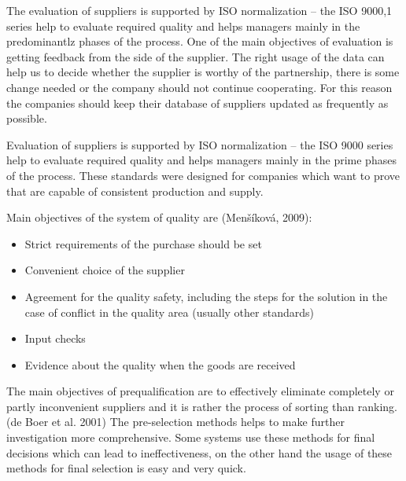 \documentclass[oneside,12pt]{article}%
\begin{document}
The evaluation of suppliers is supported by ISO normalization – the ISO 9000,1 series help to evaluate required quality and helps managers mainly in the predominantlz phases of the process.
One of the main objectives of evaluation is getting feedback from the side of the supplier. The right usage of the data can help us to decide whether the supplier is worthy of the partnership, there is some change needed or the company should not continue cooperating. For this reason the companies should keep their database of suppliers updated as frequently as possible.


Evaluation of suppliers is supported by ISO normalization – the ISO 9000 series help to evaluate required quality and helps managers mainly in the prime phases of the process. These standards were designed for companies which want to prove that are capable of consistent production and supply.

Main objectives of the system of quality are (Menšíková, 2009):
  \begin{itemize}
    \item Strict requirements of the purchase should be set
    \item Convenient choice of the supplier
    \item Agreement for the quality safety, including the steps for the solution in the case of conflict in the quality area (usually other standards)
    \item Input checks
    \item Evidence about the quality when the goods are received
  \end{itemize}

The main objectives of prequalification are to effectively eliminate completely or partly inconvenient suppliers and it is rather the process of sorting than ranking. (de Boer et al. 2001) The pre-selection methods helps to make further investigation more comprehensive. Some systems use these methods for final decisions which can lead to ineffectiveness, on the other hand the usage of these methods for final selection is easy and very quick.
\end{document}
